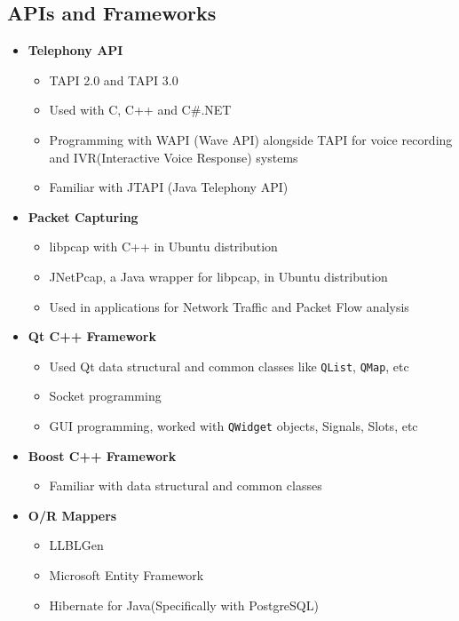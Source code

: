 \documentclass[12pt,a4paper]{article}
\begin{document}
	\subsection{APIs and Frameworks}
		\begin{itemize}
			\item \textbf{Telephony API} 
				\begin{itemize}
					\item TAPI 2.0 and TAPI 3.0
					\item Used with C, C++ and C\#.NET
					\item Programming with WAPI (Wave API) alongside TAPI for voice recording and IVR(Interactive Voice Response) systems
					\item Familiar with JTAPI (Java Telephony API)
				\end{itemize}
			\item \textbf{Packet Capturing}
				\begin{itemize}
					\item libpcap with C++ in Ubuntu distribution
					\item JNetPcap, a Java wrapper for libpcap, in Ubuntu distribution
					\item Used in applications for Network Traffic and Packet Flow analysis
				\end{itemize}
			\item \textbf{Qt C++ Framework}
				\begin{itemize}
					\item Used Qt data structural and common classes like \texttt{QList}, \texttt{QMap}, etc
					\item Socket programming
					\item GUI programming, worked with \texttt{QWidget} objects, Signals, Slots, etc
				\end{itemize}
			\item \textbf{Boost C++ Framework}
				\begin{itemize}
					\item Familiar with data structural and common classes
				\end{itemize}
			\item \textbf{O/R Mappers}
				\begin{itemize}
					\item LLBLGen
					\item Microsoft Entity Framework
					\item Hibernate for Java(Specifically with PostgreSQL)
				\end{itemize}

\end{itemize}
\end{document}
